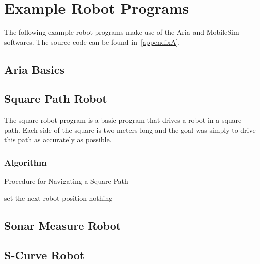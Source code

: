 \documentclass[main.tex]{subfiles}
\begin{document}
\section{Example Robot Programs}
The following example robot programs make use of the Aria and MobileSim
softwares. The source code can be found in~\ref{appendixA}.

\subsection{Aria Basics}

\subsection{Square Path Robot}
The square robot program is a basic program that drives a robot in a square
path. Each side of the square is two meters long and the goal was simply to
drive this path as accurately as possible. 

\subsubsection{Algorithm}
\begin{algorithm}
\caption{Procedure for Navigating a Square Path}
\label{alg1}
\begin{algorithmic}
		\STATE set the next robot position 
			\STATE nothing
		\ENDWHILE
	\ENDFOR
\end{algorithmic}
\end{algorithm}


\subsection{Sonar Measure Robot}

\subsection{S-Curve Robot}
\end{document}
